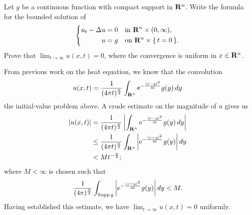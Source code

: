 \begin{problem}
  Let \(g\) be a continuous function with compact support in
  \(\mathbf{R}^n\). Write the formula for the bounded solution of
  \[
    \left\{
      \begin{aligned}
        u_t-\Delta u&=0&&\text{in \(\mathbf{R}^n\times(0,\infty)\),}\\
        u&=g&&\text{on \(\mathbf{R}^n\times\{\,t=0\,\}\).}
      \end{aligned}
    \right.
  \]
  Prove that \(\lim_{t\to\infty} u(x,t)=0\), where the convergence is
  uniform in \(x\in\mathbf{R}^n\).
\end{problem}
\begin{solution*}
  From previous work on the heat equation, we know that the convolution
  \[
    u(x,t)
    =\frac{1}{(4\pi t)^{\frac{n}{2}}}%
    \int_{\R^n}\rme^{-\frac{|x-y|^2}{4t}}g(y)\diff y
  \]
  the initial-value problem above. A crude estimate on the magnitude of
  \(u\) gives us
  \begin{align*}
    |u(x,t)|
    &=%
      \frac{1}{(4\pi t)^{\frac{n}{2}}}%
      \left|
      \int_{\R^n}\rme^{-\frac{|x-y|^2}{4t}}g(y)\diff y
      \right|\\
    &\leq%
      \frac{1}{(4\pi t)^{\frac{n}{2}}}
      \int_{\R^n}\left|\rme^{-\frac{|x-y|^2}{4t}}g(y)\right|\diff y\\
    &<M t^{-\frac{n}{2}};
  \end{align*}
  where \(M<\infty\) is chosen such that
  \[
    \frac{1}{(4\pi)^{\frac{n}{2}}}
    \int_{\operatorname{Supp} g}\left|\mathrm{e}^{-\frac{|x-y|^2}{4t}}g(y)\right|\mathop{}\!d y
    <M.
  \]
  Having established this estimate, we have \(\lim_{t\to\infty}u(x,t)=0\)
  uniformly.
\end{solution*}

